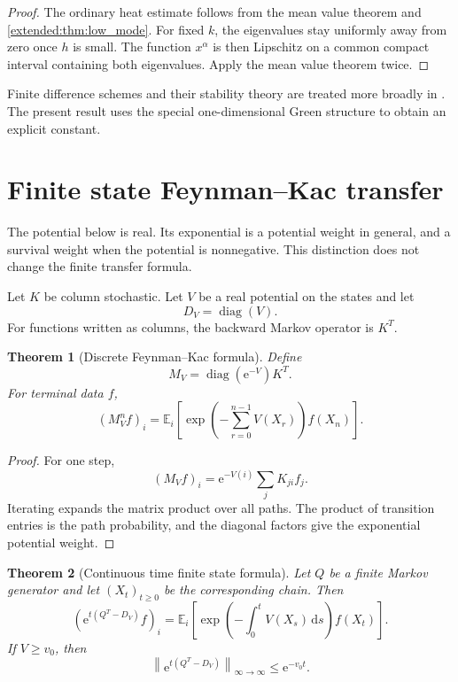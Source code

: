 \documentclass[11pt,letterpaper]{article}
\newtheorem{theorem}{Theorem}[section]
\theoremstyle{plain}
\theoremstyle{plain}
\theoremstyle{plain}
\theoremstyle{definition}
\theoremstyle{definition}
\theoremstyle{definition}
\theoremstyle{definition}
\theoremstyle{definition}
\theoremstyle{remark}
\theoremstyle{remark}
\theoremstyle{remark}
\theoremstyle{remark}
\theoremstyle{remark}
\newcommand{\Exp}{\mathbb E}
\newcommand{\diag}{\operatorname{diag}}
\newcommand{\norm}[1]{\left\lVert#1\right\rVert}
\theoremstyle{remark}
\newcommand{\e}{\mathrm e}
\newcommand{\dd}{\,\mathrm d}
\let\KomorebiPrimitivemathbb\mathbb
\renewcommand{\mathbb}[1]{{\KomorebiPrimitivemathbb{#1}}}
\let\KomorebiPrimitivemathrm\mathrm
\renewcommand{\mathrm}[1]{{\KomorebiPrimitivemathrm{#1}}}
\begin{document}
\begin{proof}
The ordinary heat estimate follows from the mean value theorem and \cref{extended:thm:low_mode}. For fixed \(k\), the eigenvalues stay uniformly away from zero once \(h\) is small. The function \(x^\alpha\) is then Lipschitz on a common compact interval containing both eigenvalues. Apply the mean value theorem twice.
\end{proof}

Finite difference schemes and their stability theory are treated more broadly in \cite{Strikwerda2004}. The present result uses the special one-dimensional Green structure to obtain an explicit constant.

\FloatBarrier
\section{Finite state Feynman--Kac transfer}\label{extended:section:13}\label{extended:sec:feynman_kac}
\begin{interpretation}
The potential below is real. Its exponential is a potential weight in general, and a survival weight when the potential is nonnegative. This distinction does not change the finite transfer formula.
\end{interpretation}

Let \(K\) be column stochastic. Let \(V\) be a real potential on the states and let
\[
D_V=\diag(V).
\]
For functions written as columns, the backward Markov operator is \(K^T\).

\begin{theorem}[Discrete Feynman--Kac formula]\label{extended:record:081}\label{extended:thm:discrete_feynman_kac}
Define
\[
M_V=\diag(\e^{-V})K^T.
\]
For terminal data \(f\),
\[
(M_V^nf)_i
=
\Exp_i\left[
\exp\left(
-\sum_{r=0}^{n-1}V(X_r)
\right)
f(X_n)
\right].
\]
\end{theorem}

\begin{proof}
For one step,
\[
(M_Vf)_i
=
\e^{-V(i)}\sum_jK_{ji}f_j.
\]
Iterating expands the matrix product over all paths. The product of transition entries is the path probability, and the diagonal factors give the exponential potential weight.
\end{proof}

\begin{theorem}[Continuous time finite state formula]\label{extended:record:082}\label{extended:thm:continuous_feynman_kac}
Let \(Q\) be a finite Markov generator and let \((X_t)_{t\geq0}\) be the corresponding chain. Then
\[
\left(
\e^{t(Q^T-D_V)}f
\right)_i
=
\Exp_i\left[
\exp\left(
-\int_0^tV(X_s)\dd s
\right)
f(X_t)
\right].
\]
If \(V\geq v_0\), then
\[
\norm{\e^{t(Q^T-D_V)}}_{\infty\to\infty}
\leq
\e^{-v_0t}.
\]
\end{theorem}
\end{document}
